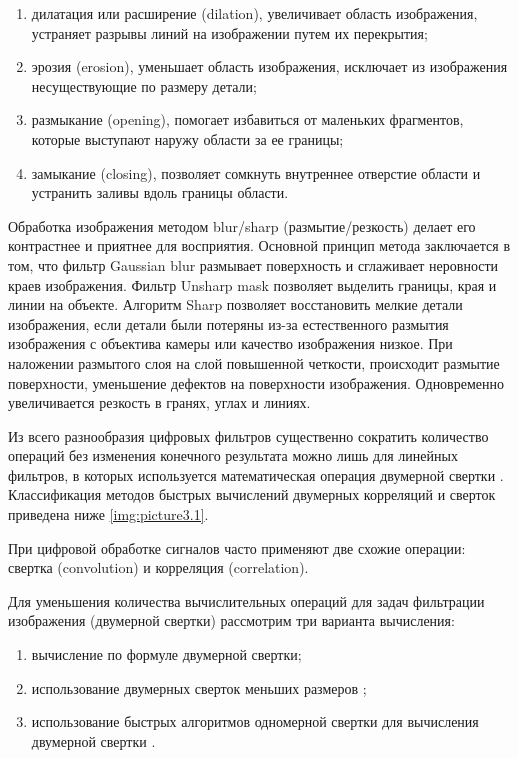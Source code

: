 \begin{enumerate}
\item дилатация или расширение (dilation), увеличивает область изображения, устраняет разрывы линий на изображении путем их перекрытия;

\item эрозия (erosion), уменьшает область изображения, исключает из изображения несуществующие по размеру детали;

\item размыкание (opening), помогает избавиться от маленьких фрагментов, которые выступают наружу области за ее границы;

\item замыкание (closing), позволяет сомкнуть внутреннее отверстие области и устранить заливы вдоль границы области.
\end{enumerate}

Обработка изображения методом blur/sharp (размытие/резкость) делает его контрастнее и приятнее для восприятия. Основной принцип метода заключается в том, что фильтр Gaussian blur размывает поверхность и сглаживает неровности краев изображения. Фильтр Unsharp mask позволяет выделить границы, края и линии на объекте. Алгоритм Sharp позволяет восстановить мелкие детали изображения, если детали были потеряны из-за естественного размытия изображения с объектива камеры или качество
изображения низкое. При наложении размытого слоя на слой повышенной четкости, происходит размытие поверхности, уменьшение дефектов на поверхности изображения. Одновременно увеличивается резкость в гранях, углах и линиях.

Из всего разнообразия цифровых фильтров существенно сократить количество операций без изменения конечного результата можно лишь для линейных фильтров, в которых используется математическая операция двумерной свертки \cite{bluehut1989fast}. 
Классификация методов быстрых вычислений двумерных корреляций и сверток приведена ниже \ref{img:picture3.1}.

При цифровой обработке сигналов часто применяют две схожие операции: свертка (convolution) и корреляция (correlation). 

Для уменьшения количества вычислительных операций для задач фильтрации изображения (двумерной свертки) рассмотрим три варианта вычисления:

\begin{enumerate}
	\item вычисление по формуле двумерной свертки;
	 
	\item использование двумерных сверток меньших размеров \cite{550562};
	
	\item использование быстрых алгоритмов одномерной свертки для вычисления двумерной свертки \cite{MOU1987377}. 
\end{enumerate}

